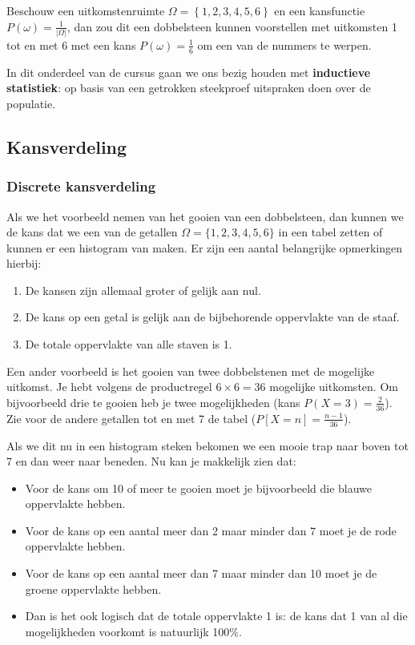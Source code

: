 {\begin{example}
Beschouw een uitkomstenruimte $\Omega =  \left\{ 1,2,3,4,5,6 \right\} $ en
een kansfunctie $P(\omega)=\frac{1}{|\Omega|}$, dan zou dit een dobbelsteen
kunnen voorstellen met uitkomsten 1 tot en met 6 met een kans
$P(\omega) = \frac{1}{6}$ om een van de nummers te werpen.
\end{example}

In dit onderdeel van de  cursus gaan we ons bezig houden met \textbf{inductieve statistiek}: op basis van een getrokken steekproef uitspraken doen over de populatie.

\subsection{Kansverdeling}
\subsubsection{Discrete kansverdeling}
Als we het voorbeeld nemen van het gooien van een dobbelsteen, dan kunnen we de kans dat we een van de getallen $\Omega = \{1,2,3,4,5,6\}$ in een tabel zetten of kunnen er een histogram van maken.  Er zijn een aantal belangrijke opmerkingen hierbij:
\begin{enumerate}
  \item De kansen zijn allemaal groter of gelijk aan nul.
  \item De kans op een getal is gelijk aan de bijbehorende oppervlakte van de staaf.
  \item De totale oppervlakte van alle staven is 1.
\end{enumerate}

Een ander voorbeeld is het gooien van twee dobbelstenen met de mogelijke uitkomst. Je hebt volgens de productregel $6 \times 6 = 36$ mogelijke uitkomsten. Om bijvoorbeeld drie te gooien heb je twee mogelijkheden (kans $P(X=3) = \frac{2}{36}$). Zie voor de andere getallen tot en met 7 de tabel ($ P[X=n] = \frac{n-1}{36}$).

Als we dit nu in een histogram steken bekomen we een mooie trap naar boven tot 7 en dan weer naar beneden. Nu kan je makkelijk zien dat:
\begin{itemize}
  \item Voor de kans om 10 of meer te gooien moet je bijvoorbeeld die blauwe oppervlakte hebben.
  \item Voor de kans op een aantal meer dan 2 maar minder dan 7 moet je de rode oppervlakte hebben.
  \item Voor de kans op een aantal meer dan 7 maar minder dan 10 moet je de groene oppervlakte hebben.
  \item Dan is het ook logisch dat de totale oppervlakte 1 is: de kans dat 1 van al die mogelijkheden voorkomt is natuurlijk 100\%.
\end{itemize}

}
